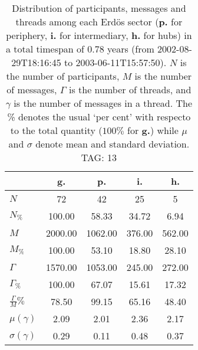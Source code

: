 \begin{table}[h!]
\begin{center}
\begin{tabular}{| l | c | c | c | c |}\hline
 & g. & p. & i. & h. \\\hline
$N$ & 72  & 42  & 25  & 5 \\\hline
$N_{\%}$ & 100.00  & 58.33  & 34.72  & 6.94 \\\hline
$M$ & 2000.00  & 1062.00  & 376.00  & 562.00 \\\hline
$M_{\%}$ & 100.00  & 53.10  & 18.80  & 28.10 \\\hline
$\Gamma$ & 1570.00  & 1053.00  & 245.00  & 272.00 \\\hline
$\Gamma_{\%}$ & 100.00  & 67.07  & 15.61  & 17.32 \\\hline
$\frac{\Gamma}{M}\%$ & 78.50  & 99.15  & 65.16  & 48.40 \\\hline
$\mu(\gamma)$ & 2.09  & 2.01  & 2.36  & 2.17 \\\hline
$\sigma(\gamma)$ & 0.29  & 0.11  & 0.48  & 0.37 \\\hline
\end{tabular}
\caption{Distribution of participants, messages and threads among each Erd\"os sector ({\bf p.} for periphery, {\bf i.} for intermediary, 
    {\bf h.} for hubs) in a total timespan of 0.78 years (from 2002-08-29T18:16:45 to 2003-06-11T15:57:50). $N$ is the number of participants, $M$ is the number of messages, $\Gamma$ is the number of threads, and $\gamma$ is the number of messages in a thread.
    The \% denotes the usual `per cent' with respecto to the total quantity ($100\%$ for {\bf g.})
    while $\mu$ and $\sigma$ denote mean and standard deviation. TAG: 13}
\end{center}
\end{table}